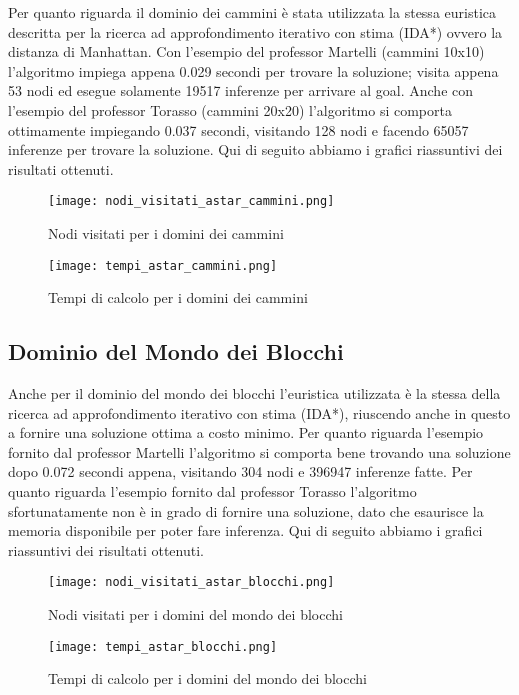Per quanto riguarda il dominio dei cammini è stata utilizzata la stessa euristica descritta per la ricerca ad approfondimento iterativo con stima (IDA*) ovvero la distanza di Manhattan. Con l'esempio del professor Martelli (cammini 10x10) l'algoritmo impiega appena 0.029 secondi per trovare la soluzione; visita appena 53 nodi ed esegue solamente 19517 inferenze per arrivare al goal. Anche con l'esempio del professor Torasso (cammini 20x20) l'algoritmo si comporta ottimamente impiegando 0.037 secondi, visitando 128 nodi e facendo 65057 inferenze per trovare la soluzione.
Qui di seguito abbiamo i grafici riassuntivi dei risultati ottenuti.

\begin{figure}[htp]
  \texttt{[image: nodi\_visitati\_astar\_cammini.png]}
  \caption{Nodi visitati per i domini dei cammini}
  \label{fig:figure13}
\end{figure}

\begin{figure}[htp]
  \texttt{[image: tempi\_astar\_cammini.png]}
  \caption{Tempi di calcolo per i domini dei cammini}
  \label{fig:figure14}
\end{figure}

\subsection{Dominio del Mondo dei Blocchi}



Anche per il dominio del mondo dei blocchi l'euristica utilizzata è la stessa della ricerca ad approfondimento iterativo con stima (IDA*), riuscendo anche in questo a fornire una soluzione ottima a costo minimo. Per quanto riguarda l'esempio fornito dal professor Martelli l'algoritmo si comporta bene trovando una soluzione dopo 0.072 secondi appena, visitando 304 nodi e 396947 inferenze fatte.
Per quanto riguarda l'esempio fornito dal professor Torasso l'algoritmo sfortunatamente non è in grado di fornire una soluzione, dato che esaurisce la memoria disponibile per poter fare inferenza.
Qui di seguito abbiamo i grafici riassuntivi dei risultati ottenuti.

\begin{figure}[htp]
  \texttt{[image: nodi\_visitati\_astar\_blocchi.png]}
  \caption{Nodi visitati per i domini del mondo dei blocchi}
  \label{fig:figure15}
\end{figure}

\begin{figure}[htp]
  \texttt{[image: tempi\_astar\_blocchi.png]}
  \caption{Tempi di calcolo per i domini del mondo dei blocchi}
  \label{fig:figure16}
\end{figure}

